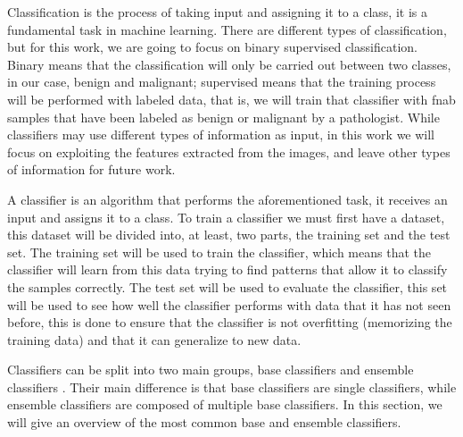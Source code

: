 
Classification is the process of taking input and assigning it to a class, it is a fundamental task in machine learning. There are different types of classification, but for this work, we are going to focus on binary supervised classification. Binary means that the classification will only be carried out between two classes, in our case, benign and malignant; supervised means that the training process will be performed with labeled data, that is, we will train that classifier with \ac{fnab} samples that have been labeled as benign or malignant by a pathologist. While classifiers may use different types of information as input, in this work we will focus on exploiting the features extracted from the images, and leave other types of information for future work.



A classifier is an algorithm that performs the aforementioned task, it receives an input and assigns it to a class. To train a classifier we must first have a dataset, this dataset will be divided into, at least, two parts, the training set and the test set. The training set will be used to train the classifier, which means that the classifier will learn from this data trying to find patterns that allow it to classify the samples correctly. The test set will be used to evaluate the classifier, this set will be used to see how well the classifier performs with data that it has not seen before, this is done to ensure that the classifier is not overfitting (memorizing the training data) and that it can generalize to new data.

Classifiers can be split into two main groups, base classifiers and ensemble classifiers \cite{yadav_comparative_2020}.
Their main difference is that base classifiers are single classifiers, while ensemble classifiers are composed of multiple base classifiers. In this section, we will give an overview of the most common base and ensemble classifiers.

